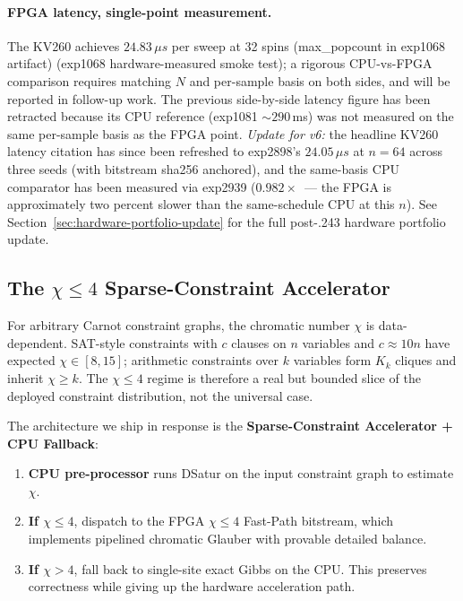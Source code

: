 \documentclass[10pt]{article}
\begin{document}
\paragraph{FPGA latency, single-point measurement.}
\label{sec:hardware-fpga-latency-singlepoint}
The KV260 achieves $24.83\,\mu s$ per sweep at 32 spins (max\_popcount in exp1068 artifact)
(exp1068 hardware-measured smoke test); a rigorous
CPU-vs-FPGA comparison requires matching $N$ and per-sample
basis on both sides, and will be reported in follow-up work.
The previous side-by-side latency figure has been retracted
because its CPU reference (exp1081 $\sim 290$\,ms) was not
measured on the same per-sample basis as the FPGA point.
\emph{Update for v6:} the headline KV260 latency citation has since
been refreshed to exp2898's $24.05\,\mu s$ at $n=64$ across three
seeds (with bitstream sha256 anchored), and the same-basis
CPU comparator has been measured via exp2939
($0.982\times$~--- the FPGA is approximately two percent slower
than the same-schedule CPU at this $n$). See
Section~\ref{sec:hardware-portfolio-update} for the full
post-.243 hardware portfolio update.

\subsection{The $\chi \leq 4$ Sparse-Constraint Accelerator}

For arbitrary Carnot constraint graphs, the chromatic number $\chi$
is data-dependent. SAT-style constraints with $c$ clauses on $n$
variables and $c \approx 10n$ have expected $\chi \in [8, 15]$;
arithmetic constraints over $k$ variables form $K_k$ cliques and
inherit $\chi \geq k$. The $\chi \leq 4$ regime is therefore a
real but bounded slice of the deployed constraint distribution,
not the universal case.

The architecture we ship in response is the \textbf{Sparse-Constraint
Accelerator + CPU Fallback}:
\begin{enumerate}
  \item \textbf{CPU pre-processor} runs DSatur on the input
        constraint graph to estimate $\chi$.
  \item \textbf{If $\chi \leq 4$}, dispatch to the FPGA $\chi \leq 4$
        Fast-Path bitstream, which implements pipelined chromatic
        Glauber with provable detailed balance.
  \item \textbf{If $\chi > 4$}, fall back to single-site exact Gibbs
        on the CPU. This preserves correctness while giving up the
        hardware acceleration path.
\end{enumerate}
\end{document}
